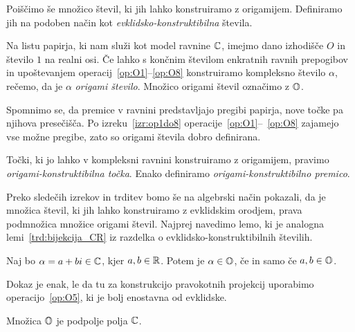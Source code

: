 Poiščimo še množico števil, ki jih lahko konstruiramo z origamijem. Definiramo jih na podoben način kot \emph{evklidsko-konstruktibilna} števila.

\begin{definicija}
    \label{def:origami_stevilo}
    Na listu papirja, ki nam služi kot model ravnine $\mathbb C$, imejmo dano izhodišče $O$ in število $1$ na realni osi. Če lahko s končnim številom enkratnih ravnih prepogibov in upoštevanjem operacij~\ref{op:O1}--\ref{op:O8} konstruiramo kompleksno število $\alpha$, rečemo, da je $\alpha$ \emph{origami število}. Množico origami števil označimo z $\mathbb O$.
\end{definicija}

Spomnimo se, da premice v ravnini predstavljajo pregibi papirja, nove točke pa njihova presečišča. Po izreku~\ref{izr:op1do8} operacije~\ref{op:O1}--~\ref{op:O8} zajamejo vse možne pregibe, zato so origami števila dobro definirana.

\begin{definicija}
    Točki, ki jo lahko v kompleksni ravnini konstruiramo z origamijem, pravimo \emph{origami-konstruktibilna točka}. Enako definiramo \emph{origami-konstruktibilno premico}.
\end{definicija}

Preko sledečih izrekov in trditev bomo še na algebrski način pokazali, da je množica števil, ki jih lahko konstruiramo z evklidskim orodjem, prava podmnožica množice origami števil. Najprej navedimo lemo, ki je analogna lemi~\ref{trd:bijekcija_CR} iz razdelka o evklidsko-konstruktibilnih številih.

\begin{lema}
    \label{trd:zaprt_koord}
    Naj bo $\alpha = a + bi \in \mathbb C$, kjer $a, b \in \mathbb R$. Potem je $\alpha \in \mathbb O$, če in samo če $a, b \in \mathbb O$.
\end{lema}
Dokaz je enak, le da tu za konstrukcijo pravokotnih projekcij uporabimo operacijo~\ref{op:O5}, ki je bolj enostavna od evklidske.

\begin{izrek}
    \label{izr:podpolje}
    Množica $\mathbb O$ je podpolje polja $\mathbb C$.
\end{izrek}

